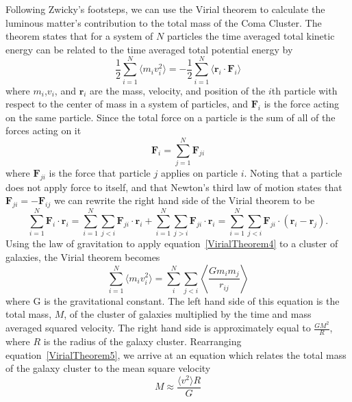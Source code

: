 Following Zwicky's footsteps, we can use the Virial theorem to calculate the luminous matter's contribution to the total mass of the Coma Cluster.  The theorem states that for a system of $N$ particles the time averaged total kinetic energy can be related to the time averaged total potential energy by
\begin{equation} \label{VirialTheorem}
\frac{1}{2} \sum_{i=1}^{N} \langle m_i v^2_i \rangle = -\frac{1}{2} \sum_{i=1}^N \langle \mathbf{r}_i \cdot {\mathbf{F}_i} \rangle
\end{equation} \label{VirialTheorem2}
where $m_i$,$v_i$, and $\mathbf{r}_i$ are the mass, velocity, and position of the $i$th particle with respect to the center of mass in a system of particles, and $\mathbf{F}_i$ is the force acting on the same particle.  Since the total force on a particle is the sum of all of the forces acting on it
\begin{equation}
\mathbf{F}_i = \sum_{j=1}^N \mathbf{F}_{ji}
\end{equation} \label{VirialTheorem3}
where $\mathbf{F}_{ji}$ is the force that particle $j$ applies on particle $i$.  Noting that a particle does not apply force to itself, and that Newton's third law of motion states that $\mathbf{F}_{ji} = -\mathbf{F}_{ij}$ we can rewrite the right hand side of the Virial theorem to be
\begin{equation} \label{VirialTheorem4}
 \sum_{i=1}^N \mathbf{F}_i \cdot \mathbf{r}_i = \sum_{i=1}^N \sum_{j<i} \mathbf{F}_{ji} \cdot \mathbf{r}_i +  \sum_{i=1}^N \sum_{j>i} \mathbf{F}_{ji} \cdot \mathbf{r}_i = \sum_{i=1}^N \sum_{j<i} \mathbf{F}_{ji} \cdot (\mathbf{r}_i - \mathbf{r}_j).
 \end{equation}
Using the law of gravitation to apply equation~\ref{VirialTheorem4} to a cluster of galaxies, the Virial theorem becomes
\begin{equation} \label{VirialTheorem5}
 \sum_{i=1}^{N} \langle m_i v^2_i \rangle = \sum_{i}^{N} \sum_{j<i} \left\langle  \frac{Gm_im_j}{r_{ij}} \right\rangle
 \end{equation}
where G is the gravitational constant.  The left hand side of this equation is the total mass, $M$, of the cluster of galaxies multiplied by the time and mass averaged squared velocity.  The right hand side is approximately equal to $\frac{GM^2}{R}$, where $R$ is the radius of the galaxy cluster.  Rearranging equation~\ref{VirialTheorem5}, we arrive at an equation which relates the total mass of the galaxy cluster to the mean square velocity
\begin{equation} \label{VirialTheorem6}
 M \approx \frac{ \langle v^2 \rangle R }{G}
\end{equation} 

